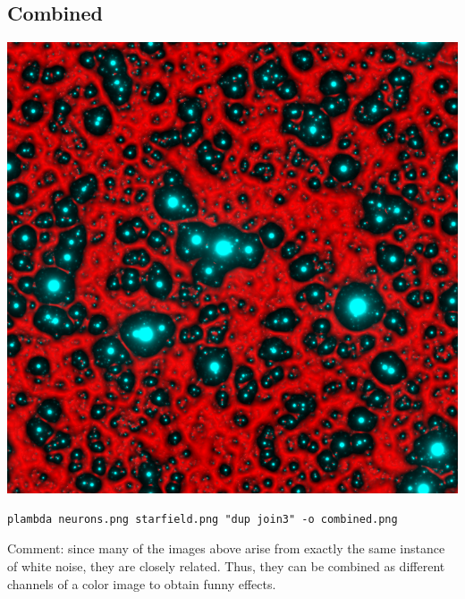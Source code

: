 \subsection{Combined}
\includegraphics{combined.png}
\begin{verbatim}
plambda neurons.png starfield.png "dup join3" -o combined.png
\end{verbatim}
Comment: since many of the images above arise from exactly the same instance of
white noise, they are closely related.  Thus, they can be combined as
different channels of a color image to obtain funny effects.

